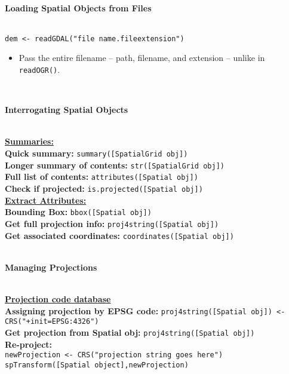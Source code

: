 \documentclass[10pt]{article}
\begin{document}
\hrulefill \\ 
\centerline{\textbf{Loading Spatial Objects from Files}} \\
\texttt{dem <- readGDAL("file name.fileextension")}
\begin{itemize}
	\item Pass the entire filename  -- path, filename, and extension -- unlike in \texttt{readOGR()}.
\end{itemize}

\hrulefill \\ 
\centerline{\textbf{Interrogating Spatial Objects}} \\
\underline{\textbf{Summaries:} }\\
\textbf{Quick summary:} \texttt{summary([SpatialGrid obj])}\\
\textbf{Longer summary of contents:} \texttt{str([SpatialGrid obj])}\\
\textbf{Full list of contents:} \texttt{attributes([Spatial obj])}\\
\textbf{Check if projected:} \texttt{is.projected([Spatial obj])}\\

\underline{\textbf{Extract Attributes:} }\\
\textbf{Bounding Box:} \texttt{bbox([Spatial obj])}\\
\textbf{Get full projection info:} \texttt{proj4string([Spatial obj])}\\
\textbf{Get associated coordinates:} \texttt{coordinates([Spatial obj])}\\


\hrulefill \\ 
\centerline{\textbf{Managing Projections}} \\
\href{http://www.spatialreference.org/}{\underline{\textbf{Projection code database}}} \\
\hspace{0.3cm}
\textbf{Assigning projection by EPSG code:} \texttt{proj4string([Spatial obj]) <-CRS("+init=EPSG:4326")}\\
\textbf{Get projection from Spatial obj:} \texttt{proj4string([Spatial obj])} \\
\textbf{Re-project:} \\
\hspace*{0.3cm}\texttt{newProjection <- CRS("projection string goes here")}\\
\hspace*{0.3cm}\texttt{spTransform([Spatial object],newProjection)}\\
\end{document}
